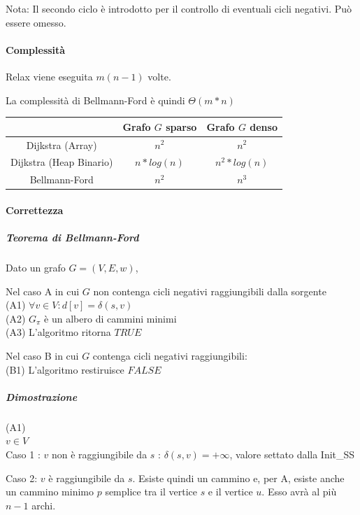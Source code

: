\documentclass[tikz]{article}
\let\oldparagraph\paragraph
\renewcommand{\paragraph}[1]{\oldparagraph{#1}\mbox{}}
\let\oldsubparagraph\subparagraph
\renewcommand{\subparagraph}[1]{\oldsubparagraph{#1}\mbox{}}
\begin{document}
{{

Nota: Il secondo ciclo è introdotto per il controllo di eventuali cicli negativi. Può essere omesso.

\paragraph{Complessità}

Relax viene eseguita $m(n-1)$ volte.

La complessità di Bellmann-Ford è quindi $\Theta(m*n)$

\begin{tabular}{|c|c|c|}
\hline 
  & Grafo $G$ sparso & Grafo $G$ denso \\ 
\hline 
Dijkstra (Array) & $n^2$ & $n^2$ \\ 
\hline 
Dijkstra (Heap Binario) & $n*log(n)$ & $n^2*log(n)$ \\ 
\hline 
Bellmann-Ford & $n^2$ & $n^3$ \\ 
\hline 
\end{tabular} 

\paragraph{Correttezza}

\subparagraph{Teorema di Bellmann-Ford}

Dato un grafo $G=(V,E,w)$, 

Nel caso A in cui $G$ non contenga cicli negativi raggiungibili dalla sorgente\\
(A1) $\forall v \in V : d[v] = \delta(s,v)$ \\
(A2) $G_\pi$ è un albero di cammini minimi\\
(A3) L'algoritmo ritorna $TRUE$

Nel caso B in cui $G$ contenga cicli negativi raggiungibili: \\
(B1) L'algoritmo restiruisce $FALSE$

\subparagraph{Dimostrazione}

(A1) \\ 
$v \in V$ \\ 
Caso 1 : $v$ non è raggiungibile da $s$ : $ \delta(s,v) = + \infty $, valore settato dalla Init\_SS

Caso 2: $v$ è raggiungibile da $s$. Esiste quindi un cammino e, per A, esiste anche un cammino minimo $p$ semplice tra il vertice $s$ e il vertice $u$. Esso avrà al più $n-1$ archi.

}}
\end{document}
